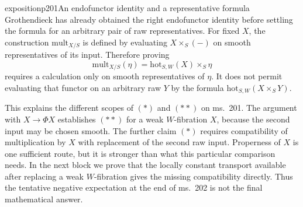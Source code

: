 \begin{dcomment}{exposition}{p201}{An endofunctor identity and a representative formula}
Grothendieck has already obtained the right endofunctor identity before settling the formula for an arbitrary pair of raw representatives. For fixed $X$, the construction $\mathrm{mult}_{X/S}$ is defined by evaluating $X\times_S(-)$ on smooth representatives of its input. Therefore proving
\[
\mathrm{mult}_{X/S}(\eta)=\mathrm{hot}_{S,W}(X)\times_S\eta
\]
requires a calculation only on smooth representatives of $\eta$. It does not permit evaluating that functor on an arbitrary raw $Y$ by the formula $\mathrm{hot}_{S,W}(X\times_S Y)$.

This explains the different scopes of $(*)$ and $(**)$ on ms.~201. The argument with $X\to\Phi X$ establishes $(**)$ for a weak $W$-fibration $X$, because the second input may be chosen smooth. The further claim $(*)$ requires compatibility of multiplication by $X$ with replacement of the second raw input. Properness of $X$ is one sufficient route, but it is stronger than what this particular comparison needs. In the next block we prove that the locally constant transport available after replacing a weak $W$-fibration gives the missing compatibility directly. Thus the tentative negative expectation at the end of ms.~202 is not the final mathematical answer.
\end{dcomment}

